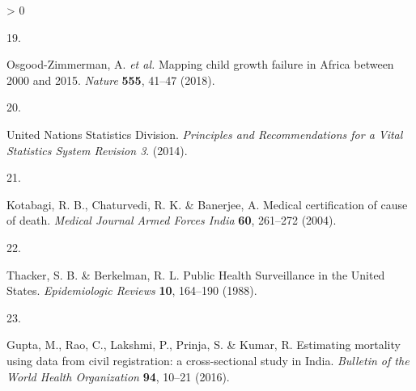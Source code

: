 \documentclass[
]{article}
\newlength{\cslhangindent}
\newlength{\csllabelwidth}
\newenvironment{CSLReferences}[2] %
 {%
  \setlength{\parindent}{0pt}
  \ifodd #1 \everypar{\setlength{\hangindent}{\cslhangindent}}\ignorespaces\fi
  \ifnum #2 > 0
  \setlength{\parskip}{#2\baselineskip}
  \fi
 }%
 {}
\newcommand{\CSLLeftMargin}[1]{\parbox[t]{\csllabelwidth}{#1}}
\newcommand{\CSLRightInline}[1]{\parbox[t]{\linewidth - \csllabelwidth}{#1}\break}
\begin{document}
\begin{CSLReferences}{0}{0}
\leavevmode\hypertarget{ref-Osgood-Zimmerman2018}{}%
\CSLLeftMargin{19. }
\CSLRightInline{Osgood-Zimmerman, A. \emph{et al.} {Mapping child growth failure in Africa between 2000 and 2015}. \emph{Nature} \textbf{555}, 41--47 (2018).}

\leavevmode\hypertarget{ref-UnitedNationsStatisticsDivision2014}{}%
\CSLLeftMargin{20. }
\CSLRightInline{United Nations Statistics Division. \emph{{Principles and Recommendations for a Vital Statistics System Revision 3}}. (2014).}

\leavevmode\hypertarget{ref-Kotabagi2004}{}%
\CSLLeftMargin{21. }
\CSLRightInline{Kotabagi, R. B., Chaturvedi, R. K. \& Banerjee, A. {Medical certification of cause of death}. \emph{Medical Journal Armed Forces India} \textbf{60}, 261--272 (2004).}

\leavevmode\hypertarget{ref-Thacker1988}{}%
\CSLLeftMargin{22. }
\CSLRightInline{Thacker, S. B. \& Berkelman, R. L. {Public Health Surveillance in the United States}. \emph{Epidemiologic Reviews} \textbf{10}, 164--190 (1988).}

\leavevmode\hypertarget{ref-Gupta2016}{}%
\CSLLeftMargin{23. }
\CSLRightInline{Gupta, M., Rao, C., Lakshmi, P., Prinja, S. \& Kumar, R. {Estimating mortality using data from civil registration: a cross-sectional study in India}. \emph{Bulletin of the World Health Organization} \textbf{94}, 10--21 (2016).}

\end{CSLReferences}
\end{document}
